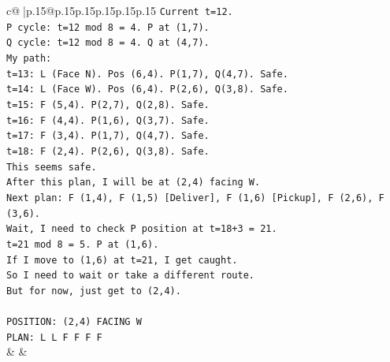 \documentclass{article}
\begin{document}
{\begin{supertabular}{c@{$\;$}|p{.15\linewidth}@{}p{.15\linewidth}p{.15\linewidth}p{.15\linewidth}p{.15\linewidth}p{.15\linewidth}}
{{{\texttt{Current t=12.} \\
\texttt{P cycle: t=12 mod 8 = 4. P at (1,7).} \\
\texttt{Q cycle: t=12 mod 8 = 4. Q at (4,7).} \\
\texttt{My path:} \\
\texttt{t=13: L (Face N). Pos (6,4). P(1,7), Q(4,7). Safe.} \\
\texttt{t=14: L (Face W). Pos (6,4). P(2,6), Q(3,8). Safe.} \\
\texttt{t=15: F (5,4). P(2,7), Q(2,8). Safe.} \\
\texttt{t=16: F (4,4). P(1,6), Q(3,7). Safe.} \\
\texttt{t=17: F (3,4). P(1,7), Q(4,7). Safe.} \\
\texttt{t=18: F (2,4). P(2,6), Q(3,8). Safe.} \\
\texttt{This seems safe.} \\
\texttt{After this plan, I will be at (2,4) facing W.} \\
\texttt{Next plan: F (1,4), F (1,5) {[}Deliver{]}, F (1,6) {[}Pickup{]}, F (2,6), F (3,6).} \\
\texttt{Wait, I need to check P position at t=18+3 = 21.} \\
\texttt{t=21 mod 8 = 5. P at (1,6).} \\
\texttt{If I move to (1,6) at t=21, I get caught.} \\
\texttt{So I need to wait or take a different route.} \\
\texttt{But for now, just get to (2,4).} \\
\\ 
\texttt{POSITION: (2,4) FACING W} \\
\texttt{PLAN: L L F F F F} \\
            }
        }
    }
    & & \\ \\


\end{supertabular}}
\end{document}
